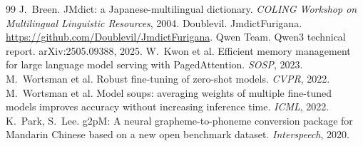 \documentclass[10pt,a4paper,twocolumn]{article}
\begin{document}
\begin{thebibliography}{99}
 J.~Breen. JMdict: a Japanese-multilingual dictionary. \emph{COLING Workshop on
Multilingual Linguistic Resources}, 2004.
 Doublevil. JmdictFurigana.
\url{https://github.com/Doublevil/JmdictFurigana}.
 Qwen Team. Qwen3 technical report. arXiv:2505.09388, 2025.
 W.~Kwon et al. Efficient memory management for large language model serving with
PagedAttention. \emph{SOSP}, 2023.
 M.~Wortsman et al. Robust fine-tuning of zero-shot models. \emph{CVPR}, 2022.
 M.~Wortsman et al. Model soups: averaging weights of multiple fine-tuned models
improves accuracy without increasing inference time. \emph{ICML}, 2022.
 K.~Park, S.~Lee. g2pM: A neural grapheme-to-phoneme conversion package for
Mandarin Chinese based on a new open benchmark dataset. \emph{Interspeech}, 2020.
\end{thebibliography}
\end{document}
